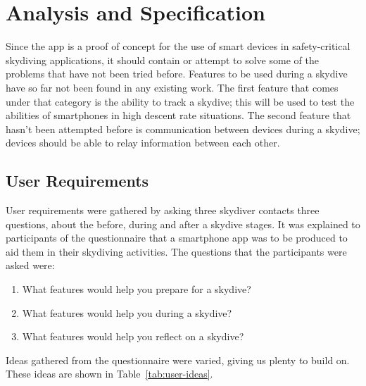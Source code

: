 \section{Analysis and Specification}\label{sec:analysis-and-spec}
Since the app is a proof of concept for the use of smart devices in safety-critical skydiving applications, it should contain or attempt to solve some of the problems that have not been tried before. Features to be used during a skydive have so far not been found in any existing work. The first feature that comes under that category is the ability to track a skydive; this will be used to test the abilities of smartphones in high descent rate situations. The second feature that hasn't been attempted before is communication between devices during a skydive; devices should be able to relay information between each other.

\subsection{User Requirements}
User requirements were gathered by asking three skydiver contacts three questions, about the before, during and after a skydive stages. It was explained to participants of the questionnaire that a smartphone app was to be produced to aid them in their skydiving activities. The questions that the participants were asked were:
\begin{enumerate}
  \item{What features would help you prepare for a skydive?}
  \item{What features would help you during a skydive?}
  \item{What features would help you reflect on a skydive?}
\end{enumerate}

Ideas gathered from the questionnaire were varied, giving us plenty to build on. These ideas are shown in Table~\vref{tab:user-ideas}.

